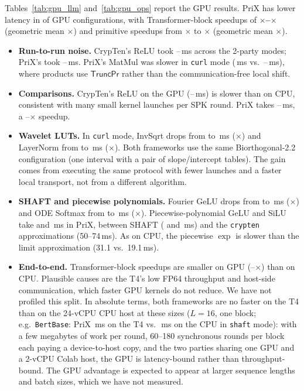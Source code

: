 \documentclass[11pt]{article}
\begin{document}
Tables~\ref{tab:gpu_llm} and~\ref{tab:gpu_ops} report the GPU results. PriX has lower latency in \gpuNumFaster{} of \gpuNumConfigs{} GPU configurations, with Transformer-block speedups of \textbf{\gpuLlmSpeedupMin$\times$--\gpuLlmSpeedupMax$\times$} (geometric mean \gpuLlmSpeedupGeomean$\times$) and primitive speedups from \gpuOpsSpeedupMin$\times$ to \gpuOpsSpeedupMax$\times$ (geometric mean \gpuOpsSpeedupGeomean$\times$).
\begin{itemize}
    \item \textbf{Run-to-run noise.} CrypTen's ReLU took \gpuCryptenReLUMin--\gpuCryptenReLUMax\,ms across the 2-party modes; PriX's took \gpuPrixReLUMin--\gpuPrixReLUMax\,ms. PriX's MatMul was slower in \texttt{curl} mode (\gpuPrixCurlMatMul\,ms vs.\ \gpuPrixShaftMatMul--\gpuPrixCryptenMatMul\,ms), where products use $\mathsf{TruncPr}$ rather than the communication-free local shift.
    \item \textbf{Comparisons.} CrypTen's ReLU on the GPU (\gpuCryptenReLUMin--\gpuCryptenReLUMax\,ms) is slower than on CPU, consistent with many small kernel launches per SPK round. PriX takes \gpuPrixReLUMin--\gpuPrixReLUMax\,ms, a \gpuSpReLUMin--\gpuSpReLUMax$\times$ speedup.
    \item \textbf{Wavelet LUTs.} In \texttt{curl} mode, InvSqrt drops from \gpuCryptenCurlInvSqrt{} to \gpuPrixCurlInvSqrt\,ms (\gpuSpCurlInvSqrt$\times$) and LayerNorm from \gpuCryptenCurlLayerNorm{} to \gpuPrixCurlLayerNorm\,ms (\gpuSpCurlLayerNorm$\times$). Both frameworks use the same Biorthogonal-2.2 configuration (one interval with a pair of slope/intercept tables). The gain comes from executing the same protocol with fewer launches and a faster local transport, not from a different algorithm.
    \item \textbf{SHAFT and piecewise polynomials.} Fourier GeLU drops from \gpuCryptenShaftGeLU{} to \gpuPrixShaftGeLU\,ms (\gpuSpShaftGeLU$\times$) and ODE Softmax from \gpuCryptenShaftSoftmax{} to \gpuPrixShaftSoftmax\,ms (\gpuSpShaftSoftmax$\times$). Piecewise-polynomial GeLU and SiLU take \gpuPrixPolyGeLU{} and \gpuPrixPolySiLU\,ms in PriX, between SHAFT (\gpuPrixShaftGeLU{} and \gpuPrixShaftSiLU\,ms) and the \texttt{crypten} approximations (50--74\,ms). As on CPU, the piecewise $\exp$ is slower than the limit approximation (31.1 vs.\ 19.1\,ms).
    \item \textbf{End-to-end.} Transformer-block speedups are smaller on GPU (\gpuLlmSpeedupMin--\gpuLlmSpeedupMax$\times$) than on CPU. Plausible causes are the T4's low FP64 throughput and host-side communication, which faster GPU kernels do not reduce. We have not profiled this split. In absolute terms, both frameworks are no faster on the T4 than on the 24-vCPU CPU host at these sizes ($L=16$, one block; e.g.\ \texttt{BertBase}: PriX \gpuPrixShaftBertBase\,ms on the T4 vs.\ \cpuPrixShaftBertBase\,ms on the CPU in \texttt{shaft} mode): with a few megabytes of work per round, 60--180 synchronous rounds per block each paying a device-to-host copy, and the two parties sharing one GPU and a 2-vCPU Colab host, the GPU is latency-bound rather than throughput-bound. The GPU advantage is expected to appear at larger sequence lengths and batch sizes, which we have not measured.
\end{itemize}
\end{document}
